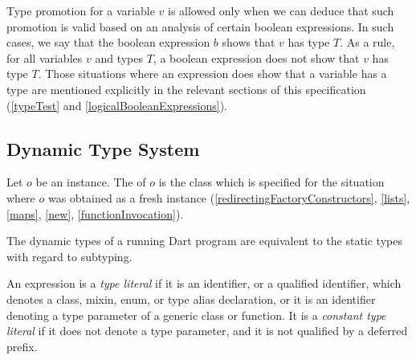 \documentclass[makeidx]{article}
\begin{document}
{\LMHash{}%
Type promotion for a variable $v$ is allowed only when we can deduce that
such promotion is valid based on an analysis of certain boolean expressions.
In such cases, we say that
the boolean expression $b$ shows that $v$ has type $T$.
As a rule, for all variables $v$ and types $T$, a boolean expression
does not show that $v$ has type $T$.
Those situations where an expression does show that a variable has a type are
mentioned explicitly in the relevant sections of this specification
(\ref{typeTest} and \ref{logicalBooleanExpressions}).


\subsection{Dynamic Type System}


\LMHash{}%
Let $o$ be an instance.
The  of $o$ is the class which is specified
for the situation where $o$ was obtained as a fresh instance
(\ref{redirectingFactoryConstructors},
\ref{lists}, \ref{maps}, \ref{new}, \ref{functionInvocation}).


\LMHash{}%
The dynamic types of a running Dart program are equivalent to
the static types with regard to subtyping.


\LMHash{}%
An expression is a \emph{type literal} if it is an identifier,
or a qualified identifier,
which denotes a class, mixin, enum, or type alias declaration, or it is
an identifier denoting a type parameter of a generic class or function.
It is a \emph{constant type literal} if it does not denote a type parameter,
and it is not qualified by a deferred prefix.


}
\end{document}
